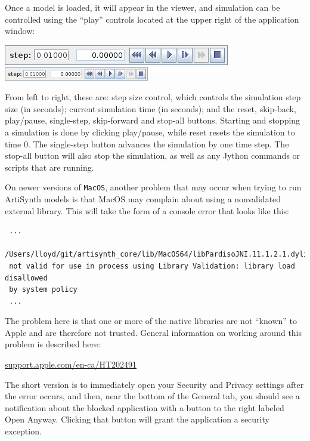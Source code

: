Once a model is loaded, it will appear in the viewer, and simulation
can be controlled using the ``play'' controls located at the upper right
of the application window:

\begin{center}
\iflatexml
  \includegraphics[]{../uiguide/images/playControls}
\else
  \includegraphics[width=2.5in]{../uiguide/images/playControls}
\fi
\end{center}

From left to right, these are: step size control, which controls the
simulation step size (in seconds); current simulation time (in
seconds); and the {\sf reset}, {\sf skip-back}, {\sf play/pause}, {\sf
single-step}, {\sf skip-forward} and {\sf stop-all} buttons.  Starting
and stopping a simulation is done by clicking {\sf play/pause}, while
{\sf reset} resets the simulation to time 0.  The {\sf single-step}
button advances the simulation by one time step. The {\sf stop-all}
button will also stop the simulation, as well as any Jython commands
or scripts that are running.

\ifMacOS

\begin{sideblock}
On newer versions of {\tt MacOS}, another problem that may occur when
trying to run ArtiSynth models is that MacOS may complain about using
a nonvalidated external library. This will take the form of a console
error that looks like this:
\begin{verbatim}
 ...
 /Users/lloyd/git/artisynth_core/lib/MacOS64/libPardisoJNI.11.1.2.1.dylib)
 not valid for use in process using Library Validation: library load disallowed
 by system policy 
 ...
\end{verbatim}
The problem here is that one or more of the native libraries are not
``known'' to Apple and are therefore not trusted. General information
on working around this problem is described here:

\href{https://support.apple.com/en-ca/HT202491}{support.apple.com/en-ca/HT202491}

The short version is to immediately open your Security and Privacy
settings after the error occurs, and then, near the bottom of the {\sf
General} tab, you should see a notification about the blocked
application with a button to the right labeled {\sf Open
Anyway}. Clicking that button will grant the application a security
exception.
\end{sideblock}

